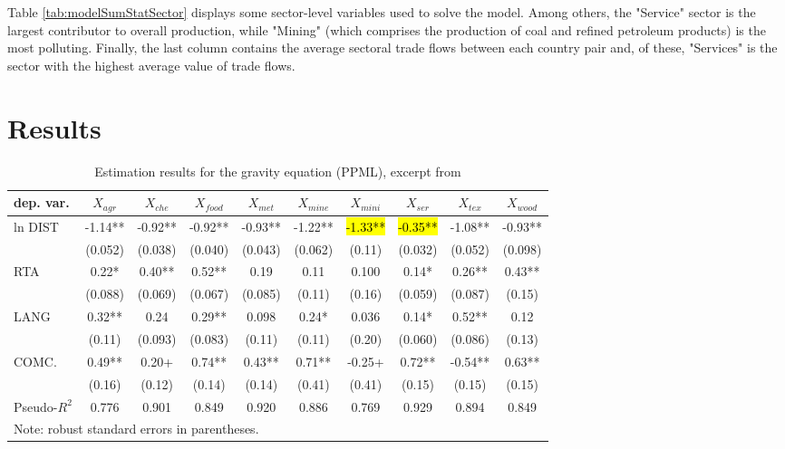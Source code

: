 Table \ref{tab:modelSumStatSector} displays some sector-level variables used to solve the model. Among others, the "Service" sector is the largest contributor to overall production, while "Mining" (which comprises the production of coal and refined petroleum products) is the most polluting. Finally, the last column contains the average sectoral trade flows between each country pair and, of these, "Services" is the sector with the highest average value of trade flows.

\section{Results}
\begin{table}[h]
\centering
\captionsetup{font=small}
\caption{Estimation results for the gravity equation (PPML), excerpt from \textcite{Larch2017}}
\label{tab:tradeFlowEst}
\begin{adjustbox}{width=.75\textwidth}
\begin{tabular}{@{}lccccccccc@{}}
\toprule
dep. var.                     & $X_{agr}$ & $X_{che}$ & $X_{food}$ & $X_{met}$ & $X_{mine}$ & $X_{mini}$ & $X_{ser}$ & $X_{tex}$ & $X_{wood}$ \\ \midrule
ln DIST                       & -1.14**   & -0.92**   & -0.92**    & -0.93**   & -1.22**    & \hl{-1.33**}    & \hl{-0.35**}   & -1.08**   & -0.93**    \\
                              & (0.052)   & (0.038)   & (0.040)    & (0.043)   & (0.062)    & (0.11)     & (0.032)   & (0.052)   & (0.098)    \\
RTA                           & 0.22*     & 0.40**    & 0.52**     & 0.19      & 0.11       & 0.100      & 0.14*     & 0.26**    & 0.43**     \\
                              & (0.088)   & (0.069)   & (0.067)    & (0.085)   & (0.11)     & (0.16)     & (0.059)   & (0.087)   & (0.15)     \\
LANG                          & 0.32**    & 0.24      & 0.29**     & 0.098     & 0.24*      & 0.036      & 0.14*     & 0.52**    & 0.12       \\
                              & (0.11)    & (0.093)   & (0.083)    & (0.11)    & (0.11)     & (0.20)     & (0.060)   & (0.086)   & (0.13)     \\
COMC.                         & 0.49**    & 0.20+     & 0.74**     & 0.43**    & 0.71**     & -0.25+     & 0.72**    & -0.54**   & 0.63**     \\
                              & (0.16)    & (0.12)    & (0.14)     & (0.14)    & (0.41)     & (0.41)     & (0.15)    & (0.15)    & (0.15)\\
Pseudo-$R^2$ & 0.776     & 0.901     & 0.849      & 0.920     & 0.886      & 0.769      & 0.929     & 0.894     & 0.849      \\ \bottomrule
\multicolumn{6}{l}{\footnotesize Note: robust standard errors in parentheses.}\\
\end{tabular}
\end{adjustbox}
\end{table}
